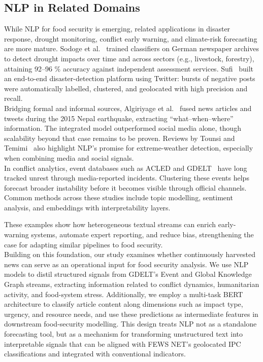 \documentclass{article}
\begin{document}
\subsection{NLP in Related Domains}

While NLP for food security is emerging, related applications in disaster response, drought monitoring, conflict early warning, and climate-risk forecasting are more mature. Sodoge et al.~\citep{Sodoge2023} trained classifiers on German newspaper archives to detect drought impacts over time and across sectors (e.g., livestock, forestry), attaining 92–96 \% accuracy against independent assessment services. Sufi~\citep{Sufi2022} built an end-to-end disaster-detection platform using Twitter: bursts of negative posts were automatically labelled, clustered, and geolocated with high precision and recall. \\

Bridging formal and informal sources, Algiriyage et al.~\citep{Algiriyage2023} fused news articles and tweets during the 2015 Nepal earthquake, extracting “what–when–where” information. The integrated model outperformed social media alone, though scalability beyond that case remains to be proven. Reviews by Tounsi and Temimi~\citep{ExtremeWeatherReview2023} also highlight NLP's promise for extreme-weather detection, especially when combining media and social signals. \\

In conflict analytics, event databases such as ACLED and GDELT~\citep{GDELT2022} have long tracked unrest through media-reported incidents. Clustering these events helps forecast broader instability before it becomes visible through official channels. Common methods across these studies include topic modelling, sentiment analysis, and embeddings with interpretability layers.

These examples show how heterogeneous textual streams can enrich early-warning systems, automate expert reporting, and reduce bias, strengthening the case for adapting similar pipelines to food security.\\

Building on this foundation, our study examines whether continuously harvested news can serve as an operational input for food security analysis. We use NLP models to distil structured signals from GDELT’s Event and Global Knowledge Graph streams, extracting information related to conflict dynamics, humanitarian activity, and food-system stress. Additionally, we employ a multi-task BERT architecture to classify article content along dimensions such as impact type, urgency, and resource needs, and use these predictions as intermediate features in downstream food-security modelling. This design treats NLP not as a standalone forecasting tool, but as a mechanism for transforming unstructured text into interpretable signals that can be aligned with FEWS NET’s geolocated IPC classifications and integrated with conventional indicators.
\end{document}
